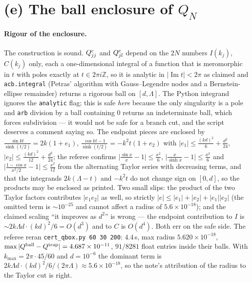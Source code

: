 \documentclass[11pt]{article}
\begin{document}
\section{(e) The ball enclosure of $Q_N$}\label{sec:e}

\paragraph{Rigour of the enclosure.}  The construction is sound.  $Q^{\rm c}_{jj}$ and
$Q^{\rm c}_{jl}$ depend on the $2N$ numbers $I(k_j)$, $C(k_j)$ only, each a one-dimensional integral
of a function that is meromorphic in $t$ with poles exactly at $t\in2\pi i\mathbb Z$, so it is
analytic in $|\operatorname{Im}t|<2\pi$ as claimed and \texttt{acb.integral} (Petras' algorithm with
Gauss--Legendre nodes and a Bernstein-ellipse remainder) returns a rigorous ball on $[d,\Lambda]$.
The Python integrand ignores the \texttt{analytic} flag; this is safe \emph{here} because the only
singularity is a pole and \texttt{arb} division by a ball containing $0$ returns an indeterminate
ball, which forces subdivision --- it would not be safe for a branch cut, and the script deserves a
comment saying so.  The endpoint pieces are enclosed by
$\frac{\sin kt}{\sinh(t/2)}=2k(1+e_1)$, $\frac{\cos kt-1}{\sinh(t/2)}=-k^2t(1+e_2)$ with
$|e_1|\le\frac{(kd)^2}6+\frac{d^2}{24}$, $|e_2|\le\frac{(kd)^2}{12}+\frac{d^2}{24}$; the referee
confirms $\bigl|\frac{\sin x}x-1\bigr|\le\frac{x^2}6$, $\bigl|\frac{x}{\sinh x}-1\bigr|\le\frac{x^2}6$
and $\bigl|\frac{1-\cos x}{x^2/2}-1\bigr|\le\frac{x^2}{12}$ from the alternating Taylor series with
decreasing terms, and that the integrands $2k(\Lambda-t)$ and $-k^2t$ do not change sign on $[0,d]$,
so the products may be enclosed as printed.  Two small slips: the product of the two Taylor factors
contributes $|e_1e_2|$ as well, so strictly $|e|\le|e_1|+|e_2|+|e_1||e_2|$ (the omitted term is
$\sim10^{-25}$ and cannot affect a radius of $5.6\times10^{-18}$); and the claimed scaling ``it
improves as $d^2$'' is wrong --- the endpoint contribution to $I$ is
$\sim2k\Lambda d\cdot(kd)^2/6=O(d^3)$ and to $C$ is $O(d^4)$.  Both err on the safe side.  The
referee reran \texttt{cert\_qbox.py 60 30 200}: $4.4$\,s, max radius $5.620\times10^{-18}$,
$\max|Q^{\rm ball}-Q^{\rm trap}|=4.687\times10^{-11}$, $91/8281$ float entries inside their balls.
With $k_{\max}=2\pi\cdot45/60$ and $d=10^{-6}$ the dominant term is
$2k\Lambda d\cdot(kd)^2/6/(2\pi\Lambda)\approx5.6\times10^{-18}$, so the note's attribution of the
radius to the Taylor cut is right.
\end{document}
